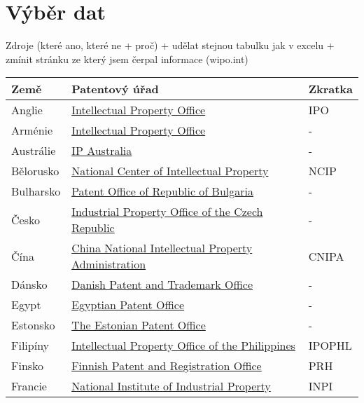 \chapter{Výběr dat}
Zdroje (které ano, které ne + proč) + udělat stejnou tabulku jak v excelu + zmínit stránku ze který jsem čerpal informace (wipo.int)
	\begin{table}[h!]
	\centering
	\begin{tabular}{|>{\centering\arraybackslash}p{2.2cm}|>{\centering\arraybackslash}p{8cm}|>{\centering\arraybackslash}p{2cm}|} 
	\hline
	\textbf{Země}    & \textbf{Patentový úřad} & \textbf{Zkratka}                \\ 
	\hline
	Anglie & \href{https://www.gov.uk/topic/intellectual-property}{Intellectual Property Office}  & IPO         \\ 
	\hline
	Arménie & \href{https://www.aipa.am/hy/}{Intellectual Property Office}  & -         \\ 
	\hline
	Austrálie & \href{https://www.ipaustralia.gov.au/}{IP Australia}  & -         \\ 
	\hline
	Bělorusko & \href{https://www.ncip.by/}{National Center of Intellectual Property}  & NCIP         \\ 
	\hline
	Bulharsko & \href{https://www.bpo.bg/}{Patent Office of Republic of Bulgaria}  & -         \\ 
	\hline
	Česko & \href{https://upv.gov.cz/}{Industrial Property Office of the Czech Republic}  & -         \\ 
	\hline
	Čína & \href{https://www.cnipa.gov.cn/}{China National Intellectual Property Administration}  & CNIPA         \\ 
	\hline
	Dánsko & \href{https://www.dkpto.org/}{Danish Patent and Trademark Office}  & -         \\ 
	\hline
	Egypt & \href{http://www.egypo.gov.eg}{Egyptian Patent Office}  & -         \\ 
	\hline
	Estonsko & \href{https://www.epa.ee/et}{The Estonian Patent Office}  & -         \\ 
	\hline
	Filipíny & \href{http://www.ipophil.gov.ph/}{Intellectual Property Office of the Philippines}  & IPOPHL         \\ 
	\hline
	Finsko & \href{http://www.prh.fi/en/index.html}{Finnish Patent and Registration Office}  & PRH         \\ 
	\hline
	Francie & \href{http://www.inpi.fr/}{National Institute of Industrial Property}  & INPI         \\ 

\end{tabular}
\end{table}
